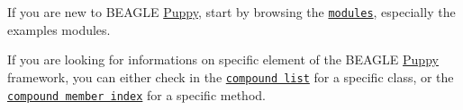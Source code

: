 If you are new to B\+E\+A\+G\+L\+E \hyperlink{namespacePuppy}{Puppy}, start by browsing the \href{modules.html}{\tt modules}, especially the examples modules.

If you are looking for informations on specific element of the B\+E\+A\+G\+L\+E \hyperlink{namespacePuppy}{Puppy} framework, you can either check in the \href{annotated.html}{\tt compound list} for a specific class, or the \href{functions.html}{\tt compound member index} for a specific method. 